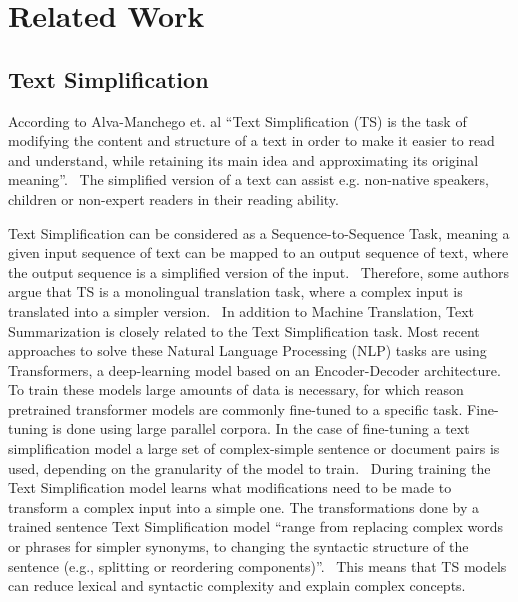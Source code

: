 \section{Related Work}
\subsection{Text Simplification}
According to Alva-Manchego et. al ``Text Simplification (TS) is the task of modifying the content and structure of a text in order to
make it easier to read and understand, while retaining its main idea and approximating its original meaning''.~\cite{AlvaManchego2020}
The simplified version of a text can assist e.g. non-native speakers, children or non-expert readers in their reading ability.~\cite{AlvaManchego2020, Jiang2020}

Text Simplification can be considered as a Sequence-to-Sequence Task, meaning a given input sequence of text can be mapped to an
output sequence of text, where the output sequence is a simplified version of the input.~\cite{Goldberg2017}
Therefore, some authors argue that TS is a monolingual translation task, where a complex input is translated into a simpler version.~\cite{Aumiller2022}
In addition to Machine Translation, Text Summarization is closely related to the Text Simplification task.
Most recent approaches to solve these Natural Language Processing (NLP) tasks are using Transformers, a deep-learning model based on an Encoder-Decoder architecture.
To train these models large amounts of data is necessary, for which reason pretrained transformer models are commonly fine-tuned to a specific task.
Fine-tuning is done using large parallel corpora. In the case of fine-tuning a text simplification model a large set of complex-simple sentence or document pairs is used,
depending on the granularity of the model to train.~\cite{Jurafsky2023} During training the Text Simplification model learns what modifications need to be made to transform a complex input into a simple one.
The transformations done by a trained sentence Text Simplification model ``range from replacing complex words or phrases for simpler synonyms, to changing the
syntactic structure of the sentence (e.g., splitting or reordering components)''.~\cite{AlvaManchego2020} This means that TS models can reduce 
lexical and syntactic complexity and explain complex concepts.~\cite{Saeuberli2020}


